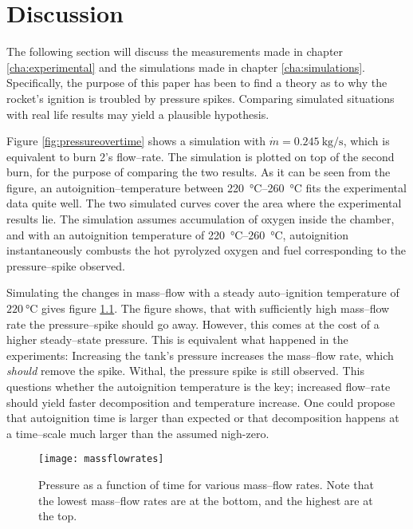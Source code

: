 \chapter{Discussion}

	The following section will discuss the measurements made in chapter \ref{cha:experimental} and the simulations made in chapter \ref{cha:simulations}. Specifically, the purpose of this paper has been to find a theory as to why the rocket's ignition is troubled by pressure spikes. Comparing simulated situations with real life results may yield a plausible hypothesis. 
	
	Figure \ref{fig:pressureovertime} shows a simulation with $\dot{m} = \SI{0.245}{\kg\per\s}$, which is equivalent to burn 2's flow--rate. The simulation is plotted on top of the second burn, for the purpose of comparing the two results. As it can be seen from the figure, an autoignition--temperature between \SIrange{220}{260}{\celsius} fits the experimental data quite well. The two simulated curves cover the area where the experimental results lie. The simulation assumes accumulation of oxygen inside the chamber, and with an autoignition temperature of \SIrange{220}{260}{\celsius}, autoignition instantaneously combusts the hot pyrolyzed oxygen and fuel corresponding to the pressure--spike observed.
	
	Simulating the changes in mass--flow with a steady auto--ignition temperature of $\SI{220}{\celsius}$ gives figure \ref{fig:massflows}. The figure shows, that with sufficiently high mass--flow rate the pressure--spike should go away. However, this comes at the cost of a higher steady--state pressure. This is equivalent what happened in the experiments: Increasing the tank's pressure increases the mass--flow rate, which \emph{should} remove the spike. Withal, the pressure spike is still observed. This questions whether the autoignition temperature is the key; increased flow--rate should yield faster decomposition and temperature increase. One could propose that autoignition time is larger than expected or that decomposition happens at a time--scale much larger than the assumed nigh-zero.
	
	
	\begin{figure}
		\centering
		\texttt{[image: massflowrates]}
		\caption{Pressure as a function of time for various mass--flow rates. Note that the lowest mass--flow rates are at the bottom, and the highest are at the top.}
		\label{fig:massflows}
	\end{figure}